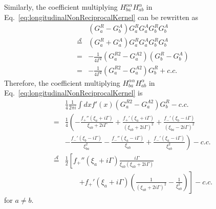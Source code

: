 \documentclass[twocolumn,superscriptaddress]{revtex4-1}
\begin{document}
Similarly, the coefficient multiplying $H_{ba}^{\alpha\alpha} H_{ab}^\alpha$ in Eq.~\eqref{eq:longitudinalNonReciprocalKernel} can be rewritten as
\begin{align}
  &(G^R_a-G^A_b)G^R_a G^A_a G^R_b G^A_b \nonumber \\
\overset{\mathcal{A}}{=}&(G^R_a+G^A_a)G^R_a G^A_a G^R_b G^A_b \nonumber \\
=&-\frac{1}{4\Gamma^2}(G^{R2}_a-G^{A2}_a)(G^{R}_b-G^{A}_b) \nonumber \\
=&-\frac{1}{4\Gamma^2}(G^{R2}_a-G^{A2}_a)G^R_b +c.c.
\end{align}
Therefore, the coefficient multiplying $H_{ba}^{\alpha\alpha} H_{ab}^\alpha$ in Eq.~\eqref{eq:longitudinalNonReciprocalKernel} is
\begin{align}
  &\frac{1}{4}\frac{1}{2\pi i}\int dx f'(x)(G^{R2}_a-G^{A2}_a)G^R_b -c.c. \nonumber \\
  =&\frac{1}{4}\left(-\frac{f_+''(\xi_a+i\Gamma)}{\xi_{ab}+2i\Gamma}+\frac{f_+'(\xi_a+i\Gamma)}{(\xi_{ab}+2i\Gamma)^2}+\frac{f_-'(\xi_b-i\Gamma)}{(\xi_{ba}-2i\Gamma)^2} \right. \nonumber \\
      &\left. -\frac{f_-'(\xi_b-i\Gamma)}{\xi_{ba}^2}-\frac{f_-''(\xi_a-i\Gamma)}{\xi_{ab}}+\frac{f_-'(\xi_{a}-i\Gamma)}{\xi_{ab}^2}\right)-c.c. \nonumber \\
\overset{\mathcal{A}}{=}&\frac{1}{2}\left[
  f_+''(\xi_a+i\Gamma)\frac{i\Gamma}{\xi_{ab}(\xi_{ab}+2i\Gamma)} \right. \nonumber \\
&\qquad \left. +f_+'(\xi_a+i\Gamma)\left(\frac{1}{(\xi_{ab}+2i\Gamma)^2}-\frac{1}{\xi_{ab}^2}\right)
\right]-c.c.
\end{align}
for $a\neq b$.
\end{document}
